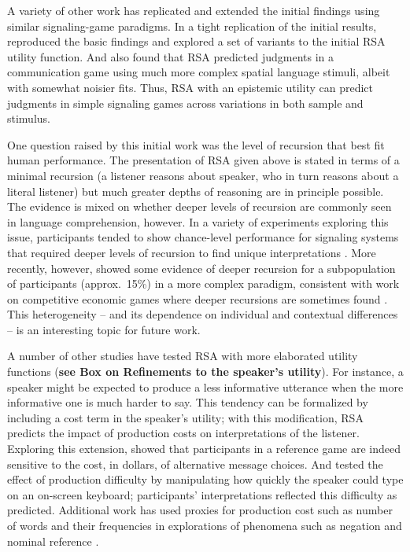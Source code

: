 \documentclass[]{elsarticle}
\begin{document}
A variety of other work has replicated and extended the initial findings
using similar signaling-game paradigms. In a tight replication of the
initial results, \citet{qing2015} reproduced the basic findings and
explored a set of variants to the initial RSA utility function.
And \citet{carstensen2014} also found that RSA
predicted judgments in a communication game using much more complex
spatial language stimuli, albeit with somewhat noisier fits. Thus, RSA
with an epistemic utility can predict judgments in simple signaling
games across variations in both sample and stimulus.

One question raised by this initial work was the level of recursion that
best fit human performance. The presentation of RSA given above is
stated in terms of a minimal recursion (a listener reasons about
speaker, who in turn reasons about a literal listener) but much greater
depths of reasoning are in principle possible. The evidence is mixed on whether deeper levels of recursion are commonly seen in language comprehension, however. In a variety of experiments exploring this issue, participants tended to show chance-level performance for signaling systems that required deeper levels of
recursion to find unique interpretations \citep{stiller2011,degen2012,vogel2013}. More recently,
however, \citet{franke2016} showed some evidence of deeper recursion
for a subpopulation of participants (approx.~15\%) in a more
complex paradigm, consistent with work on competitive economic
games where deeper recursions are sometimes found \citep{camerer2004}. This heterogeneity -- and its dependence
on individual and contextual differences -- is an interesting topic for
future work.

A number of other studies have tested RSA with more elaborated utility functions (\textbf{see Box on Refinements to the speaker’s utility}). For instance, a speaker might be expected to
produce a less informative utterance when the more informative one is
much harder to say. This tendency can be formalized by including a cost
term in the speaker's utility; with this modification, RSA
predicts the impact of production costs on interpretations of the
listener. Exploring this extension, \citet{bergen2012} showed that participants in a reference
game are indeed sensitive to the cost, in dollars, of alternative
message choices. And \cite{degen2013} tested the effect of production
difficulty by manipulating how quickly the speaker could type on an
on-screen keyboard; participants' interpretations reflected this difficulty
as predicted. Additional work has used proxies for production cost
such as number of words and their frequencies in explorations of phenomena such as negation and nominal reference \citep{nordmeyer2014,graf2016}.
\end{document}
